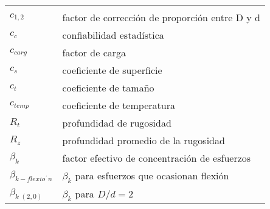 \begin{mytable}[H]
	\centering
	\begin{tabular}{ll}
		\multicolumn{1}{c}{\quad\quad\quad} & \multicolumn{1}{c}{} \\
		$c_{1,2}$ \quad\quad\quad& factor de corrección de proporción entre D y d \\	
		$c_{c}$ & confiabilidad estadística \\
		$c_{carg}$ & factor de carga \\
		$c_{s}$ & coeficiente de superficie \\
		$c_{t}$ & coeficiente de tamaño \\
		$c_{temp}$ & coeficiente de temperatura \\
		$R_{t}$ & profundidad de rugosidad \\
		$R_{z}$ & profundidad promedio de la rugosidad \\
		$\beta_{k}$ & factor efectivo de concentración de esfuerzos \\
		$\beta_{k-flexio^{´}n}$ & $\beta_{k}$ para esfuerzos que ocasionan flexión \\
		$\beta_{k \; (2,0)}$ & $\beta_{k}$ para $D/d =2$ \\
	\end{tabular}
\end{mytable}

\newpage
